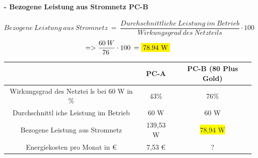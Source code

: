 \documentclass[a4paper]{article}
\begin{document}
    \paragraph{\color{codegreen} - Bezogene Leistung aus Stromnetz PC-B}
    \begin{equation*}
        Bezogene\:Leistung\:aus\:Stromnetz\:=\:\frac{Durchschnittliche\:Leistung\:im\:Betrieb}{Wirkungsgrad\:des\:Netzteils}\cdot 100
    \end{equation*}
    \begin{equation*}
        =>\frac{60\:W}{76\:}\cdot 100\:=\colorbox{yellow}{78.94 W}
    \end{equation*}
    \begin{center}
        \begin{tabular}{|c|c|c|}
            \hline
            & {\color[HTML]{32CB00} PC-A} & {\color[HTML]{32CB00} PC-B \color[HTML]{FFD700}(80 Plus Gold)} \\ \hline
            {\color[HTML]{32CB00} Wirkungsgrad des Netztei ls bei 60 W in \%} & {\color[HTML]{32CB00} 43\%}    & {\color[HTML]{32CB00} 76\%} \\ \hline
            {\color[HTML]{32CB00} Durchschnittl iche Leistung im Betrieb}    & {\color[HTML]{32CB00} 60 W}     & {\color[HTML]{32CB00} 60 W}  \\ \hline
            {\color[HTML]{32CB00} Bezogene Leistung aus Stromnetz}           & {\color[HTML]{32CB00} 139,53 W} & {\color[HTML]{FE0000} \colorbox{yellow}{78,94 W}}    \\ \hline
            {\color[HTML]{32CB00} Energiekosten pro Monat in €}              & {\color[HTML]{CB0000} 7,53 €}       & {\color[HTML]{FE0000} ?}    \\ \hline
        \end{tabular}
    \end{center}
\end{document}
